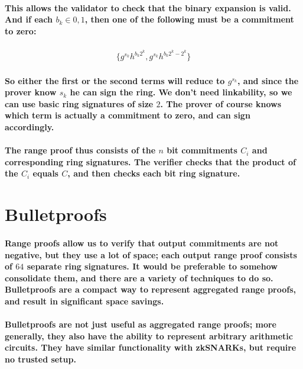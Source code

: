 \documentclass{article}
\begin{document}
\paragraph{This allows the validator to check that the binary expansion is valid.  And if each $b_k \in {0, 1}$, then one of the following must be a commitment to zero:}

\begin{eqnarray}
  \{g^{s_k} h^{b_k 2^k}, g^{s_k} h^{b_k 2^k - 2^k}\}
\end{eqnarray}

\paragraph{So either the first or the second terms will reduce to $g^{s_k}$, and since the prover know $s_k$ he can sign the ring.  We don’t need linkability, so we can use basic ring signatures of size $2$. The prover of course knows which term is actually a commitment to zero, and can sign accordingly.}

\paragraph{The range proof thus consists of the $n$ bit commitments $C_i$ and corresponding ring signatures.  The verifier checks that the product of the $C_i$ equals $C$, and then checks each bit ring signature.}



\section{Bulletproofs}

\paragraph{Range proofs allow us to verify that output commitments are not negative, but they use a lot of space; each output range proof consists of $64$ separate ring signatures.  It would be preferable to somehow consolidate them, and there are a variety of techniques to do so.  Bulletproofs are a compact way to represent aggregated range proofs, and result in significant space savings.}

\paragraph{Bulletproofs are not just useful as aggregated range proofs; more generally, they also have the ability to represent arbitrary arithmetic circuits.  They have similar functionality with zkSNARKs, but require no trusted setup.}
\end{document}
